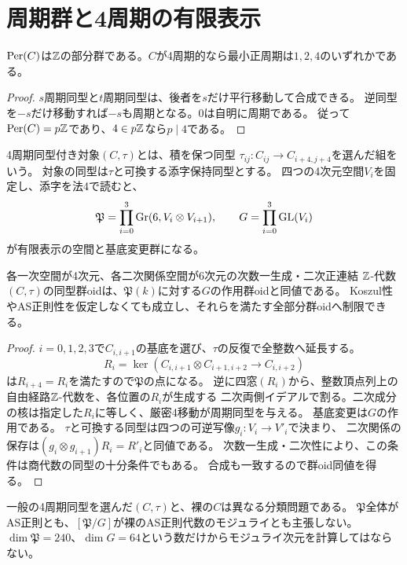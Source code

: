 \section{周期群と4周期の有限表示}
\begin{lemma}\label{lem:period-subgroup}
$\operatorname{Per}(C)$は$\mathbb Z$の部分群である。$C$が4周期的なら最小正周期は$1,2,4$のいずれかである。
\end{lemma}
\begin{proof}
$s$周期同型と$t$周期同型は、後者を$s$だけ平行移動して合成できる。
逆同型を$-s$だけ移動すれば$-s$も周期となる。$0$は自明に周期である。
従って$\operatorname{Per}(C)=p\mathbb Z$であり、$4\in p\mathbb Z$なら$p\mid4$である。
\end{proof}

4周期同型付き対象$(C,\tau)$とは、積を保つ同型
$\tau_{ij}:C_{ij}\to C_{i+4,j+4}$を選んだ組をいう。
対象の同型は$\tau$と可換する添字保持同型とする。
四つの4次元空間$V_i$を固定し、添字を法4で読むと、
\[
 \mathfrak P=\prod_{i=0}^3\operatorname{Gr}(6,V_i\otimes V_{i+1}),\qquad
 G=\prod_{i=0}^3\operatorname{GL}(V_i)
\]
が有限表示の空間と基底変更群になる。

\begin{theorem}[4周期表示の有限四窓atlas]\label{thm:four-window}
各一次空間が4次元、各二次関係空間が6次元の次数一生成・二次正連結
$\mathbb Z$-代数$(C,\tau)$の同型群oidは、$\mathfrak P(k)$に対する$G$の作用群oidと同値である。
Koszul性やAS正則性を仮定しなくても成立し、それらを満たす全部分群oidへ制限できる。
\end{theorem}
\begin{proof}
$i=0,1,2,3$で$C_{i,i+1}$の基底を選び、$\tau$の反復で全整数へ延長する。
\[
 R_i=\ker(C_{i,i+1}\otimes C_{i+1,i+2}\longrightarrow C_{i,i+2})
\]
は$R_{i+4}=R_i$を満たすので$\mathfrak P$の点になる。
逆に四窓$(R_i)$から、整数頂点列上の自由経路$\mathbb Z$-代数を、各位置の$R_i$が生成する
二次両側イデアルで割る。二次成分の核は指定した$R_i$に等しく、厳密4移動が周期同型を与える。
基底変更は$G$の作用である。
$\tau$と可換する同型は四つの可逆写像$g_i:V_i\to V'_i$で決まり、
二次関係の保存は$(g_i\otimes g_{i+1})R_i=R'_i$と同値である。
次数一生成・二次性により、この条件は商代数の同型の十分条件でもある。
合成も一致するので群oid同値を得る。
\end{proof}

\begin{remark}\label{rem:forget4}
一般の4周期同型を選んだ$(C,\tau)$と、裸の$C$は異なる分類問題である。
$\mathfrak P$全体がAS正則とも、$[\mathfrak P/G]$が裸のAS正則代数のモジュライとも主張しない。
$\dim\mathfrak P=240$、$\dim G=64$という数だけからモジュライ次元を計算してはならない。
\end{remark}


